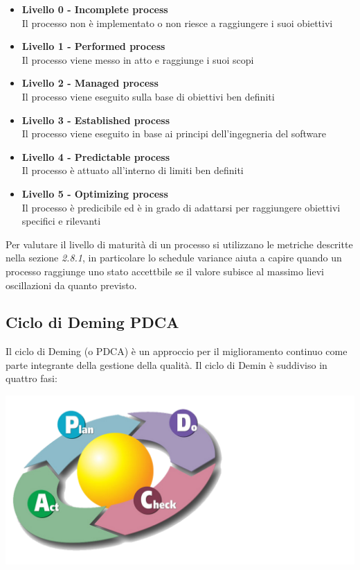 {\begin{itemize}
  \item \textbf{Livello 0 - Incomplete process}\\
  Il processo non è implementato o non riesce a raggiungere i suoi obiettivi
  \item \textbf{Livello 1 - Performed process}\\
  Il processo viene messo in atto e raggiunge i suoi scopi
  \item  \textbf{Livello 2 - Managed process}\\
  Il processo viene eseguito sulla base di obiettivi ben definiti
  \item  \textbf{Livello 3 - Established process}\\
  Il processo viene eseguito in base ai principi dell’ingegneria del software
  \item  \textbf{Livello 4 - Predictable process}\\
  Il processo è attuato all’interno di limiti ben definiti
  \item  \textbf{Livello 5 - Optimizing process}\\
  Il processo è predicibile ed è in grado di adattarsi per raggiungere obiettivi specifici e rilevanti
\end{itemize}

Per valutare il livello di maturità di un processo si utilizzano le metriche descritte nella sezione \emph{2.8.1}, in particolare lo schedule variance aiuta a capire quando un processo raggiunge uno stato accettbile se il valore subisce al massimo lievi oscillazioni da quanto previsto.





\subsection{Ciclo di Deming PDCA}
Il ciclo di Deming (o PDCA) è un approccio per il miglioramento continuo come parte integrante della gestione della qualità.
Il ciclo di Demin è suddiviso in quattro fasi: \\




   \begin{center}
   \includegraphics[scale=0.3]{img/deming.png}
\end{center}



}
